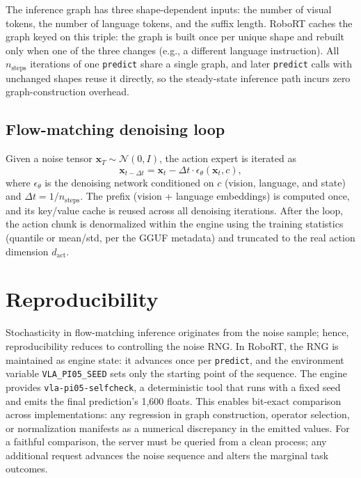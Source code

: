 \documentclass[11pt]{article}
\begin{document}
The inference graph has three shape-dependent inputs: the number of visual
tokens, the number of language tokens, and the suffix length. RoboRT caches
the graph keyed on this triple: the graph is built once per unique shape and
rebuilt only when one of the three changes (e.g., a different language
instruction). All $n_{\text{steps}}$ iterations of one \texttt{predict}
share a single graph, and later \texttt{predict} calls with unchanged shapes
reuse it directly, so the steady-state inference path incurs zero
graph-construction overhead.

\subsection{Flow-matching denoising loop}
\label{sec:method-denoise}

Given a noise tensor $\mathbf{x}_T \sim \mathcal{N}(0, I)$, the action expert
is iterated as
\begin{equation}
  \mathbf{x}_{t-\Delta t} = \mathbf{x}_t - \Delta t \cdot \epsilon_\theta(\mathbf{x}_t, c),
  \label{eq:denoise}
\end{equation}
where $\epsilon_\theta$ is the denoising network conditioned on $c$ (vision,
language, and state) and $\Delta t = 1/n_{\text{steps}}$. The prefix
(vision + language embeddings) is computed once, and its key/value cache is
reused across all denoising iterations. After the loop, the action chunk is
denormalized within the engine using the training statistics (quantile or
mean/std, per the GGUF metadata) and truncated to the real action dimension
$d_{\text{act}}$.

\section{Reproducibility}
\label{sec:repro}

Stochasticity in flow-matching inference originates from the noise sample;
hence, reproducibility reduces to controlling the noise RNG. In RoboRT, the
RNG is maintained as engine state: it advances once per \texttt{predict},
and the environment variable \texttt{VLA\_PI05\_SEED} sets only the starting
point of the sequence. The engine provides \texttt{vla-pi05-selfcheck}, a
deterministic tool that runs with a fixed seed and emits the final
prediction's 1,600 floats. This enables bit-exact comparison across
implementations: any regression in graph construction, operator selection,
or normalization manifests as a numerical discrepancy in the emitted values.
For a faithful comparison, the server must be queried from a clean process;
any additional request advances the noise sequence and alters the marginal
task outcomes.
\end{document}
